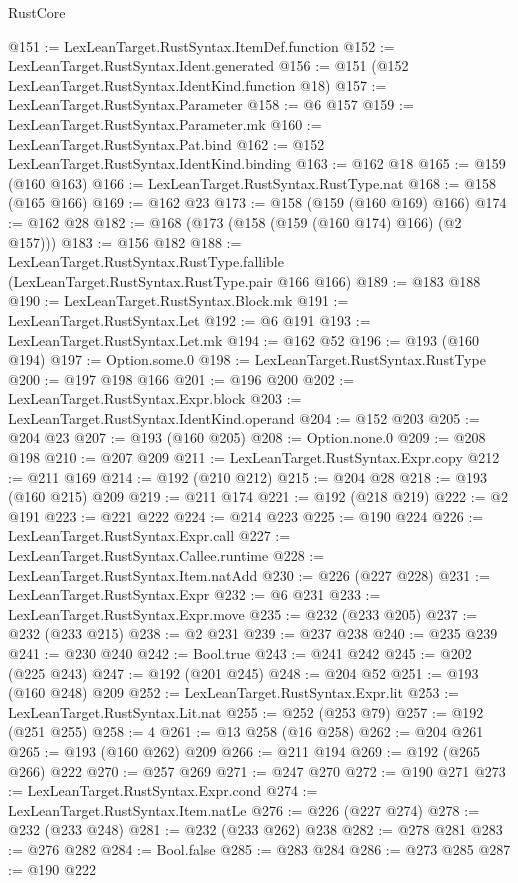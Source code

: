 \begin{lexlean}{RustCore}
\begin{coremodule}
@151 := LexLeanTarget.RustSyntax.ItemDef.function
@152 := LexLeanTarget.RustSyntax.Ident.generated
@156 := @151 (@152 LexLeanTarget.RustSyntax.IdentKind.function @18)
@157 := LexLeanTarget.RustSyntax.Parameter
@158 := @6 @157
@159 := LexLeanTarget.RustSyntax.Parameter.mk
@160 := LexLeanTarget.RustSyntax.Pat.bind
@162 := @152 LexLeanTarget.RustSyntax.IdentKind.binding
@163 := @162 @18
@165 := @159 (@160 @163)
@166 := LexLeanTarget.RustSyntax.RustType.nat
@168 := @158 (@165 @166)
@169 := @162 @23
@173 := @158 (@159 (@160 @169) @166)
@174 := @162 @28
@182 := @168 (@173 (@158 (@159 (@160 @174) @166) (@2 @157)))
@183 := @156 @182
@188 := LexLeanTarget.RustSyntax.RustType.fallible
    (LexLeanTarget.RustSyntax.RustType.pair @166 @166)
@189 := @183 @188
@190 := LexLeanTarget.RustSyntax.Block.mk
@191 := LexLeanTarget.RustSyntax.Let
@192 := @6 @191
@193 := LexLeanTarget.RustSyntax.Let.mk
@194 := @162 @52
@196 := @193 (@160 @194)
@197 := Option.some.{0}
@198 := LexLeanTarget.RustSyntax.RustType
@200 := @197 @198 @166
@201 := @196 @200
@202 := LexLeanTarget.RustSyntax.Expr.block
@203 := LexLeanTarget.RustSyntax.IdentKind.operand
@204 := @152 @203
@205 := @204 @23
@207 := @193 (@160 @205)
@208 := Option.none.{0}
@209 := @208 @198
@210 := @207 @209
@211 := LexLeanTarget.RustSyntax.Expr.copy
@212 := @211 @169
@214 := @192 (@210 @212)
@215 := @204 @28
@218 := @193 (@160 @215) @209
@219 := @211 @174
@221 := @192 (@218 @219)
@222 := @2 @191
@223 := @221 @222
@224 := @214 @223
@225 := @190 @224
@226 := LexLeanTarget.RustSyntax.Expr.call
@227 := LexLeanTarget.RustSyntax.Callee.runtime
@228 := LexLeanTarget.RustSyntax.Item.natAdd
@230 := @226 (@227 @228)
@231 := LexLeanTarget.RustSyntax.Expr
@232 := @6 @231
@233 := LexLeanTarget.RustSyntax.Expr.move
@235 := @232 (@233 @205)
@237 := @232 (@233 @215)
@238 := @2 @231
@239 := @237 @238
@240 := @235 @239
@241 := @230 @240
@242 := Bool.true
@243 := @241 @242
@245 := @202 (@225 @243)
@247 := @192 (@201 @245)
@248 := @204 @52
@251 := @193 (@160 @248) @209
@252 := LexLeanTarget.RustSyntax.Expr.lit
@253 := LexLeanTarget.RustSyntax.Lit.nat
@255 := @252 (@253 @79)
@257 := @192 (@251 @255)
@258 := 4
@261 := @13 @258 (@16 @258)
@262 := @204 @261
@265 := @193 (@160 @262) @209
@266 := @211 @194
@269 := @192 (@265 @266) @222
@270 := @257 @269
@271 := @247 @270
@272 := @190 @271
@273 := LexLeanTarget.RustSyntax.Expr.cond
@274 := LexLeanTarget.RustSyntax.Item.natLe
@276 := @226 (@227 @274)
@278 := @232 (@233 @248)
@281 := @232 (@233 @262) @238
@282 := @278 @281
@283 := @276 @282
@284 := Bool.false
@285 := @283 @284
@286 := @273 @285
@287 := @190 @222

\end{coremodule}
\end{lexlean}

